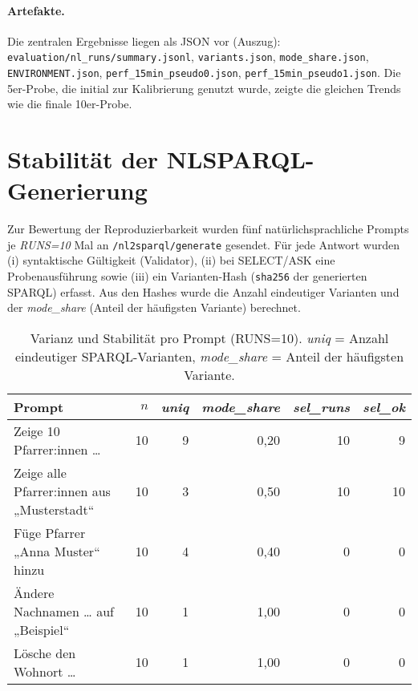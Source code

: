 \paragraph{Artefakte.}
Die zentralen Ergebnisse liegen als JSON vor (Auszug): \texttt{evaluation/nl\_runs/summary.jsonl}, \texttt{variants.json}, \texttt{mode\_share.json}, \texttt{ENVIRONMENT.json}, \texttt{perf\_15min\_pseudo0.json}, \texttt{perf\_15min\_pseudo1.json}. Die 5er-Probe, die initial zur Kalibrierung genutzt wurde, zeigte die gleichen Trends wie die finale 10er-Probe.

\section{Stabilität der NL{\textrightarrow}SPARQL-Generierung}
\label{subsec:stability}
Zur Bewertung der Reproduzierbarkeit wurden fünf natürlichsprachliche Prompts je \emph{RUNS=10} Mal an \texttt{/nl2sparql/generate} gesendet. Für jede Antwort wurden (i) syntaktische Gültigkeit (Validator), (ii) bei SELECT/ASK eine Probenausführung sowie (iii) ein Varianten-Hash (\texttt{sha256} der generierten SPARQL) erfasst. Aus den Hashes wurde die Anzahl eindeutiger Varianten und der \emph{mode\_share} (Anteil der häufigsten Variante) berechnet.

\begin{table}[h]
\centering
\begin{tabular}{lrrrrr}
\toprule
Prompt & $n$ & \textit{uniq} & \textit{mode\_share} & \textit{sel\_runs} & \textit{sel\_ok} \\
\midrule
Zeige 10 Pfarrer:innen \dots         & 10 &  9 & 0{,}20 & 10 &  9 \\
Zeige alle Pfarrer:innen aus „Musterstadt“ & 10 &  3 & 0{,}50 & 10 & 10 \\
Füge Pfarrer „Anna Muster“ hinzu     & 10 &  4 & 0{,}40 &  0 &  0 \\
Ändere Nachnamen \dots{} auf „Beispiel“   & 10 &  1 & 1{,}00 &  0 &  0 \\
Lösche den Wohnort \dots             & 10 &  1 & 1{,}00 &  0 &  0 \\
\bottomrule
\end{tabular}
\caption{Varianz und Stabilität pro Prompt (RUNS=10). \textit{uniq} = Anzahl eindeutiger SPARQL-Varianten, \textit{mode\_share} = Anteil der häufigsten Variante.}
\label{tab:nl2sparql-stability}
\end{table}

